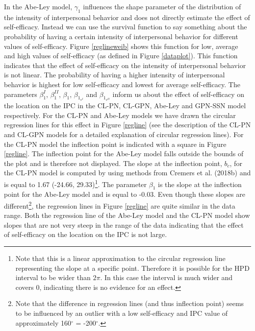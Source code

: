 \documentclass[man,mask]{apa6}
\let\rmarkdownfootnote\footnote%
\def\footnote{\protect\rmarkdownfootnote}
\begin{document}
\indent In the Abe-Ley model, \(\gamma_1\) influences the shape parameter of the distribution of
the intensity of interpersonal behavior and does not directly estimate the effect
of self-efficacy. Instead we can use the survival function to say something
about the probability of having a certain intensity of interpersonal behavior for
different values of self-efficacy. Figure \ref{reglineweib} shows this function
for low, average and high values of self-efficacy (as defined in Figure
\ref{dataplot}). This function indicates that the effect of self-efficacy on the
intensity of interpersonal behavior is not linear. The probability of having a
higher intensity of interpersonal behavior is highest for low self-efficacy and
lowest for average self-efficacy.\newline
\indent The parameters \(\beta_1^{I}\), \(\beta_1^{II}\), \(\beta_1\),
\(\beta_{1_{s^{I}}}\) and \(\beta_{1_{s^{II}}}\) inform us about the effect of
self-efficacy on the location on the IPC in the CL-PN, CL-GPN,
Abe-Ley and GPN-SSN model respectively. For the CL-PN and Abe-Ley models we have
drawn the circular regression lines for this effect in Figure \ref{regline} (see
the description of the CL-PN and CL-GPN models for a detailed explanation of
circular regression lines). For the CL-PN model the inflection point is
indicated with a square in Figure \ref{regline}. The inflection point for the
Abe-Ley model falls outside the bounds of the plot and is therefore not
displayed. The slope at the inflection point, \(b_c\), for the CL-PN model is
computed by using methods from Cremers et al. (2018b) and is equal to 1.67
(-24.66, 29.33)\footnote{Note that this is a linear approximation to the
circular regression line representing the slope at a specific point. Therefore
it is possible for the HPD interval to be wider than $2\pi$. In this case the
interval is much wider and covers 0, indicating there is no evidence for an
effect.}. The parameter \(\beta_1\) is the slope at the inflection point for the
Abe-Ley model and is equal to -0.03. Even though these slopes are
different\footnote{Note that the difference in regression lines (and thus inflection point) seems to be influenced by an outlier with a low self-efficacy and IPC value of approximately 160$^{\circ}$ = -200$^{\circ}$.}, the regression lines in Figure \ref{regline} are quite similar in the
data range. Both the regression line of the Abe-Ley model and the CL-PN model
show slopes that are not very steep in the range of the data indicating that the
effect of self-efficacy on the location on the IPC is not large.
\end{document}
